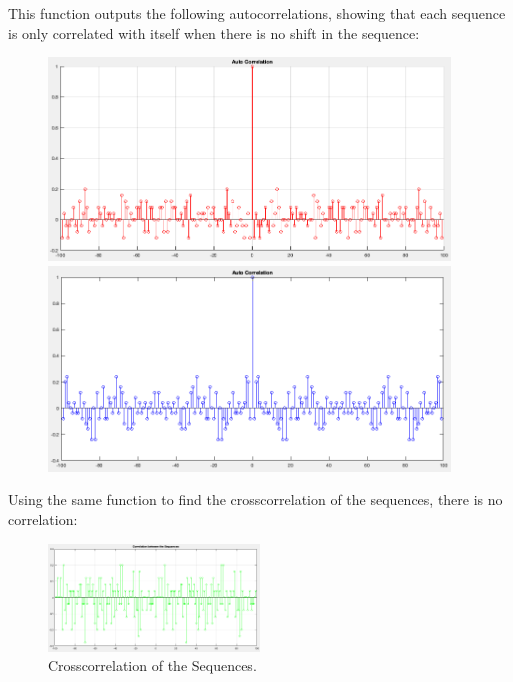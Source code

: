 \documentclass[12pt]{article}
\begin{document}
    \vspace{10pt}
    This function outputs the following autocorrelations, showing that each 
    sequence is only correlated with itself when there is no shift in the 
    sequence:

    \begin{figure}[H]
      \centering
      \begin{minipage}{0.5\textwidth}
        \centering
        \includegraphics[width=0.95\textwidth]{seq1_xcorr.png}
      \end{minipage}%
      \begin{minipage}{0.5\textwidth}
        \centering
        \includegraphics[width=0.95\textwidth]{seq2_xcorr.png}
      \end{minipage}
    \end{figure}

    \vspace{10pt}
    Using the same function to find the crosscorrelation of the sequences, 
    there is no correlation:

    \begin{figure}[H]
      \centering
      \includegraphics[width=0.5\textwidth]{xcorr.png}
      \caption{Crosscorrelation of the Sequences.}
    \end{figure}
\end{document}
